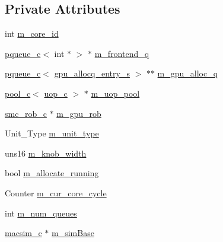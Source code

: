 \subsection*{Private Attributes}
\begin{DoxyCompactItemize}
\item 
int \hyperlink{classsmc__allocate__c_abaeb422a48ef93fb71cabc5390dee7b9}{m\_\-core\_\-id}
\item 
\hyperlink{classpqueue__c}{pqueue\_\-c}$<$ int $\ast$ $>$ $\ast$ \hyperlink{classsmc__allocate__c_a3db2b8a63184bcda1bd1d9a2231becf7}{m\_\-frontend\_\-q}
\item 
\hyperlink{classpqueue__c}{pqueue\_\-c}$<$ \hyperlink{structgpu__allocq__entry__s}{gpu\_\-allocq\_\-entry\_\-s} $>$ $\ast$$\ast$ \hyperlink{classsmc__allocate__c_ad36b7e814f1f2199295dce4d617ff035}{m\_\-gpu\_\-alloc\_\-q}
\item 
\hyperlink{classpool__c}{pool\_\-c}$<$ \hyperlink{classuop__c}{uop\_\-c} $>$ $\ast$ \hyperlink{classsmc__allocate__c_a1fce12aa293716b7c3ea687c0400dcf3}{m\_\-uop\_\-pool}
\item 
\hyperlink{classsmc__rob__c}{smc\_\-rob\_\-c} $\ast$ \hyperlink{classsmc__allocate__c_a8975102c918ebb18ff50b054d70fd1a3}{m\_\-gpu\_\-rob}
\item 
Unit\_\-Type \hyperlink{classsmc__allocate__c_aeb14fe67ed777300d891a22ed3db120d}{m\_\-unit\_\-type}
\item 
uns16 \hyperlink{classsmc__allocate__c_a5cdf0163de169d08e9b51a760381c66d}{m\_\-knob\_\-width}
\item 
bool \hyperlink{classsmc__allocate__c_a8369b4404232451b5fec0eff0d6ef011}{m\_\-allocate\_\-running}
\item 
Counter \hyperlink{classsmc__allocate__c_ae5879c983f2dd0520f6fb4e76d90271f}{m\_\-cur\_\-core\_\-cycle}
\item 
int \hyperlink{classsmc__allocate__c_afea356100a59d2bf67ee102c1e41e4f2}{m\_\-num\_\-queues}
\item 
\hyperlink{classmacsim__c}{macsim\_\-c} $\ast$ \hyperlink{classsmc__allocate__c_abd96160a09d01811d1920c3330731107}{m\_\-simBase}
\end{DoxyCompactItemize}


